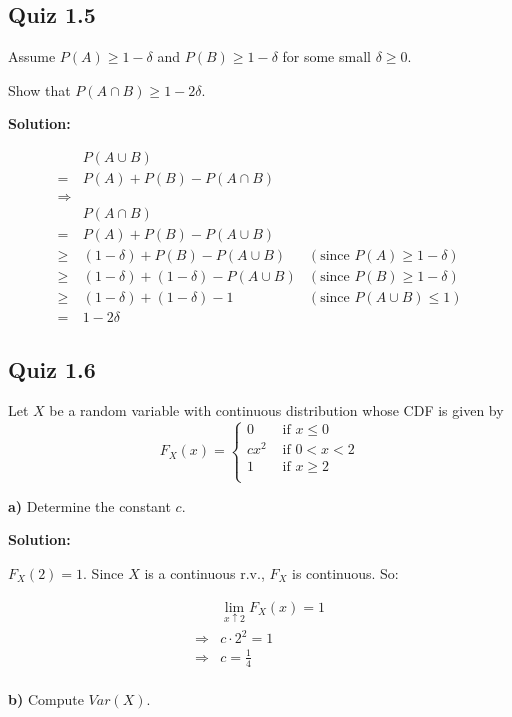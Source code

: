 \documentclass{article}
\begin{document}
\subsection{Quiz 1.5}

Assume
\(P(A) \geq 1-\delta\) and \(P(B) \geq 1-\delta\) for some small \(\delta\geq0\).

Show that \(P(A\cap B) \geq 1-2\delta\).

\textbf{Solution:}

\begin{align*}
	 & P(A\cup B) \\
	=& P(A)+P(B)-P(A\cap B) \\
	\Rightarrow& \\
	 & P(A\cap B) \\
	=& P(A)+P(B)-P(A\cup B) \\
	\geq& (1-\delta)+P(B)-P(A\cup B) & (\text{since }P(A) \geq 1-\delta) \\
	\geq& (1-\delta)+(1-\delta)-P(A\cup B) & (\text{since }P(B) \geq 1-\delta) \\
	\geq& (1-\delta)+(1-\delta)-1 & (\text{since }P(A\cup B) \leq 1) \\
	=& 1-2\delta
\end{align*}

\subsection{Quiz 1.6}

Let \(X\) be a random variable with continuous distribution whose CDF is given by
\[F_X(x) = \begin{cases}
	0 &\text{ if } x\leq 0 \\
	cx^2 &\text{ if } 0<x<2 \\
	1 &\text{ if } x \geq 2 \\
\end{cases}\]

\textbf{a)} Determine the constant \(c\).

\textbf{Solution:}

\(F_X(2)=1\). Since \(X\) is a continuous r.v., \(F_X\) is continuous. So:

\begin{align*}
	 & \lim_{x\uparrow 2}F_X(x)=1 \\
	\Rightarrow & c\cdot 2^2=1 \\
	\Rightarrow & c=\frac14 \\
\end{align*}

\textbf{b)} Compute \(Var(X)\).
\end{document}
